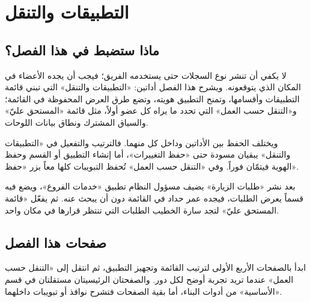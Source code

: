 \chapter{التطبيقات والتنقل}
\label{ch:builder-navigation}

\section{ماذا ستضبط في هذا الفصل؟}
\label{sec:builder-navigation-intro}

لا يكفي أن تنشر نوع السجلات حتى يستخدمه الفريق؛ فيجب أن يجده الأعضاء في المكان الذي يتوقعونه. ويشرح هذا الفصل أداتين: «التطبيقات والتنقل» التي تبني قائمة التطبيقات وأقسامها، وتمنح التطبيق هويته، وتضع طرق العرض المحفوظة في القائمة؛ و«التنقل حسب العمل» التي تحدد ما يراه كل عضو أولاً، مثل قائمة «المستحق عليّ» والسياق المشترك ونطاق بيانات اللوحات.

ويختلف الحفظ بين الأداتين وداخل كل منهما. فالترتيب والتفعيل في «التطبيقات والتنقل» يبقيان مسودة حتى «حفظ التغييرات»، أما إنشاء التطبيق أو القسم وحفظ الهوية فيتمّان فوراً. وفي «التنقل حسب العمل» تُحفظ التبويبات كلها معاً بزر «حفظ».

\begin{rcnote}
بعد نشر «طلبات الزيارة» يضيف مسؤول النظام تطبيق «خدمات الفروع»، ويضع فيه قسماً يعرض الطلبات، فيجده عمر حداد في القائمة دون أن يبحث عنه. ثم يفعّل «قائمة المستحق عليّ» لتجد سارة الخطيب الطلبات التي تنتظر قرارها في مكان واحد.
\end{rcnote}

\section{صفحات هذا الفصل}
\label{sec:builder-navigation-pages}

ابدأ بالصفحات الأربع الأولى لترتيب القائمة وتجهيز التطبيق، ثم انتقل إلى «التنقل حسب العمل» عندما تريد تجربة أوضح لكل دور. والصفحتان الرئيسيتان مستقلتان في قسم «الأساسية» من أدوات البناء، أما بقية الصفحات فتشرح نوافذ أو تبويبات داخلهما.

